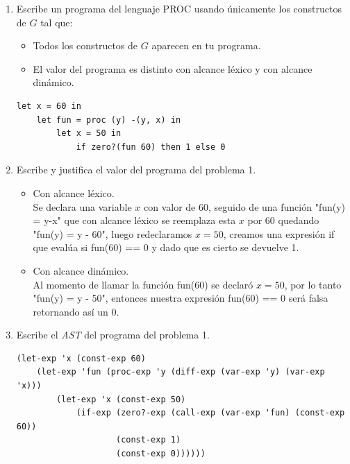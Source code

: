 \documentclass[a4paper, 10pt]{article}
\begin{document}
\begin{enumerate}
    \item Escribe un programa del lenguaje PROC usando únicamente los constructos de $G$ tal que:
    \begin{itemize}
        \item Todos los constructos de $G$ aparecen en tu programa.
        \item El valor del programa es distinto con alcance léxico y con alcance dinámico.
    \end{itemize}
\begin{lstlisting}
let x = 60 in
    let fun = proc (y) -(y, x) in
        let x = 50 in
            if zero?(fun 60) then 1 else 0
\end{lstlisting}


    \item Escribe y justifica el valor del programa del problema 1.
    \begin{itemize}
        \item Con alcance léxico. \\
            {\color{azul} Se declara una variable $x$ con valor de 60, seguido de una función "fun(y) = y-x" que con alcance léxico se reemplaza esta $x$ por 60 quedando "fun(y) = y - 60", luego redeclaramos $x = 50$, creamos una expresión if que evalúa si fun(60) == 0 y dado que es cierto se devuelve 1.}
        \item Con alcance dinámico. \\
            {\color{azul} Al momento de llamar la función fun(60) se declaró $x = 50$, por lo tanto "fun(y) = y - 50", entonces nuestra expresión fun(60) == 0 será falsa retornando así un 0.}
    \end{itemize}



    \item Escribe el \textsl{AST} del programa del problema 1.
\begin{lstlisting}
(let-exp 'x (const-exp 60)
    (let-exp 'fun (proc-exp 'y (diff-exp (var-exp 'y) (var-exp 'x)))
        (let-exp 'x (const-exp 50)
            (if-exp (zero?-exp (call-exp (var-exp 'fun) (const-exp 60))
                    (const-exp 1)
                    (const-exp 0))))))
\end{lstlisting}
\end{enumerate}
\end{document}

